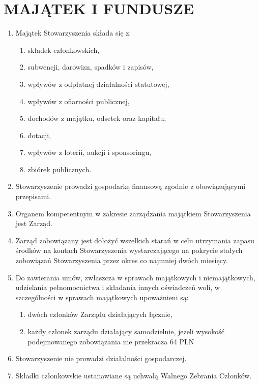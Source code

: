 \documentclass[a4paper,draft,10pt]{article}
\begin{document}
\section{MAJĄTEK I FUNDUSZE}
  \begin{enumerate}
    \item Majątek Stowarzyszenia składa się z:
      \begin{enumerate}
        \item składek członkowskich,
        \item subwencji, darowizn, spadków i zapisów,
        \item wpływów z odpłatnej działalności statutowej,
        \item wpływów z ofiarności publicznej,
        \item dochodów z majątku, odsetek oraz kapitału,
        \item dotacji,
        \item wpływów z loterii, aukcji i sponsoringu,
        \item zbiórek publicznych.
      \end{enumerate}
    \item Stowarzyszenie prowadzi gospodarkę finansową zgodnie z obowiązującymi przepisami.
    \item Organem kompetentnym w zakresie zarządzania majątkiem Stowarzyszenia jest Zarząd.
    \item Zarząd zobowiązany jest dołożyć wszelkich starań w celu utrzymania zapasu środków na kontach Stowarzyszenia wystarczającego na pokrycie stałych zobowiązań Stowarzyszenia przez okres co najmniej dwóch miesięcy.
    \item Do zawierania umów, zwłaszcza w sprawach majątkowych i niemajątkowych, udzielania pełnomocnictwa i składania innych oświadczeń woli, w szczególności w sprawach majątkowych upoważnieni są:
      \begin{enumerate}
        \item dwóch członków Zarządu działających łącznie,
        \item każdy członek zarządu działający samodzielnie, jeżeli wysokość podejmowanego zobowiązania nie przekracza 64 PLN\@
      \end{enumerate}
    \item Stowarzyszenie nie prowadzi działalności gospodarczej.
    \item Składki członkowskie ustanawiane są uchwałą Walnego Zebrania Członków.
  \end{enumerate}
\end{document}
